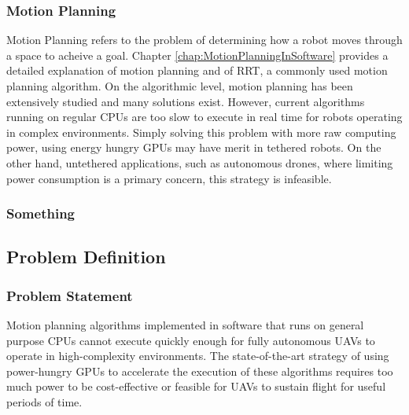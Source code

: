         

    \subsubsection*{Motion Planning}
        
        Motion Planning refers to the problem of determining how a robot moves through a space to acheive a goal. Chapter \ref{chap:MotionPlanningInSoftware} provides a detailed explanation of motion planning and of \ac{RRT}, a commonly used motion planning algorithm.
        \newline
        On the algorithmic level, motion planning has been extensively studied and many solutions exist. However, current algorithms running on regular \ac{CPU}s are too slow to execute in real time for robots operating in complex environments. Simply solving this problem with more raw computing power, using energy hungry \ac{GPU}s may have merit in tethered robots. On the other hand, untethered applications, such as autonomous drones, where limiting power consumption is a primary concern, this strategy is infeasible.
        
    \subsubsection*{Something}

\newpage
\subsection{Problem Definition}

    \subsubsection*{Problem Statement}
    Motion planning algorithms implemented in software that runs on general purpose \ac{CPU}s cannot execute quickly enough for fully autonomous \ac{UAV}s to operate in high-complexity environments. The state-of-the-art strategy of using power-hungry \ac{GPU}s to accelerate the execution of these algorithms requires too much power to be cost-effective or feasible for \ac{UAV}s to sustain flight for useful periods of time. 


